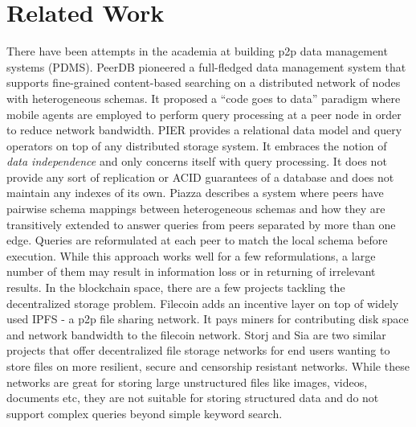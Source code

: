 \section{Related Work}
There have been attempts in the academia at building p2p data management systems (PDMS). PeerDB \cite{PeerDB} pioneered a full-fledged data management system that supports fine-grained content-based searching on a distributed network of nodes with heterogeneous schemas. It proposed a ``code goes to data'' paradigm where mobile agents are employed to perform query processing at a peer node in order to reduce network bandwidth. PIER \cite{PIER} provides a relational data model and query operators on top of any distributed storage system. It embraces the notion of \textit{data independence} and only concerns itself with query processing. It does not provide any sort of replication or ACID guarantees of a database and does not maintain any indexes of its own. Piazza \cite{Piazza} describes a system where peers have pairwise schema mappings between heterogeneous schemas and how they are transitively extended to answer queries from peers separated by more than one edge. Queries are reformulated at each peer to match the local schema before execution. While this approach works well for a few reformulations, a large number of them may result in information loss or in returning of irrelevant results.
\newline\newline
In the blockchain space, there are a few projects tackling the decentralized storage problem. Filecoin \cite{Filecoin}
adds an incentive layer on top of widely used IPFS \cite{ipfs} - a p2p file sharing network. It pays miners for
contributing disk space and network bandwidth to the filecoin network. Storj \cite{Storj} and Sia \cite{Sia} are two
similar projects that offer decentralized file storage networks for end users wanting to store files on more resilient,
secure and censorship resistant networks. While these networks are great for storing large unstructured files like
images, videos, documents etc, they are not suitable for storing structured data and do not support complex queries
beyond simple keyword search.
\newline\newline
